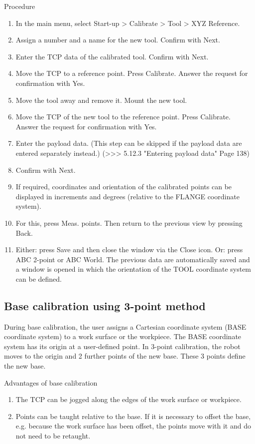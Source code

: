 		Procedure
		\begin{enumerate}
			\item In the main menu, select Start-up > Calibrate > Tool > XYZ Reference.
			\item Assign a number and a name for the new tool. Confirm with Next.
			\item Enter the TCP data of the calibrated tool. Confirm with Next.
			\item Move the TCP to a reference point. Press Calibrate. Answer the request for confirmation with Yes. 
			\item Move the tool away and remove it. Mount the new tool.
			\item Move the TCP of the new tool to the reference point. Press Calibrate. Answer the request for confirmation with Yes.
			\item Enter the payload data. (This step can be skipped if the payload data are entered separately instead.)
				(>>> 5.12.3 "Entering payload data" Page 138)
			\item Confirm with Next.
			\item If required, coordinates and orientation of the calibrated points can be displayed in increments and degrees (relative to the FLANGE coordinate system).
			\item For this, press Meas. points. Then return to the previous view by pressing Back.
			\item Either: press Save and then close the window via the Close icon.
			Or: press ABC 2-point or ABC World. The previous data are automatically saved and a window is opened in which the orientation of the TOOL coordinate system can be defined.
		\end{enumerate}
		
		\subsection{Base calibration using 3-point method}
		
		During base calibration, the user assigns a Cartesian coordinate system (BASE coordinate system) to a work surface or the workpiece. The BASE coordinate system has its origin at a user-defined point. In 3-point calibration, the robot moves to the origin and 2 further points of the new base. These 3 points define the new base.
		
		Advantages of base calibration
		\begin{enumerate}
			\item The TCP can be jogged along the edges of the work surface or workpiece.
			\item Points can be taught relative to the base. If it is necessary to offset the base, e.g. because the work surface has been offset, the points move with it and do not need to be retaught.
		\end{enumerate}
		
